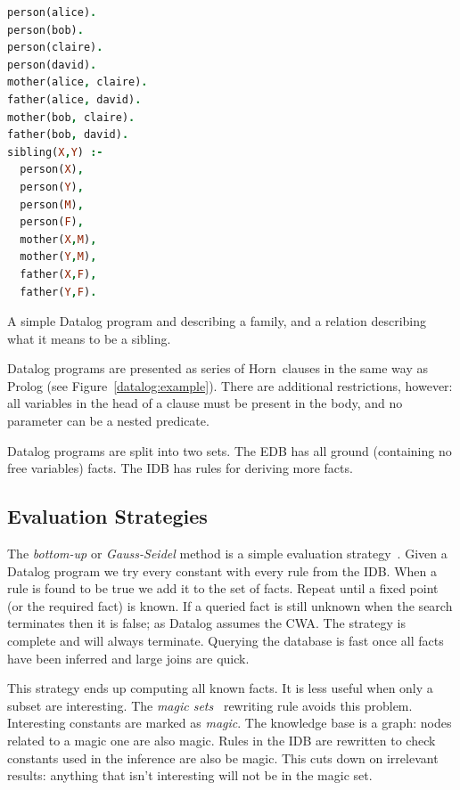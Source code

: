 \documentclass[a4paper]{article}
\begin{document}
\begin{marginfigure}
  \label{datalog:example}
  \begin{lstlisting}[language=Prolog]
person(alice).  
person(bob).
person(claire). 
person(david).
mother(alice, claire).
father(alice, david).
mother(bob, claire).
father(bob, david).
sibling(X,Y) :- 
  person(X),
  person(Y),
  person(M),   
  person(F),
  mother(X,M),
  mother(Y,M), 
  father(X,F), 
  father(Y,F).
  \end{lstlisting}
  \caption{A simple Datalog program and describing a family, and a relation
  describing what it means to be a sibling.}
\end{marginfigure}

Datalog programs are presented as series of Horn~clauses in the
same way as Prolog (see Figure~\ref{datalog:example}).  There are
additional restrictions, however: all variables in the head of a clause
must be present in the body, and no parameter can be a nested predicate.

Datalog programs are split into two sets.
The \ac{EDB} has all ground (containing no free variables) facts.
The \ac{IDB} has rules for deriving more facts.

\subsection{Evaluation Strategies}

The \emph{bottom-up} or \emph{Gauss-Seidel} method is a simple evaluation
strategy~\cite{Ceri:1989ff}.  Given a Datalog program we try every constant with
every rule from the \ac{IDB}.  When a rule is found to be true we add it to the set
of facts.  Repeat until a fixed point (or the required fact) is known.  If a
queried fact is still unknown when the search terminates then it is false; as Datalog assumes
the \ac{CWA}.  The strategy is complete and will always
terminate. Querying the database is fast once all facts have been inferred 
and large joins are quick.

This strategy ends up computing all known facts. It is less useful when only a
subset are interesting.  The \emph{magic sets}~\cite{Bancilhon:1985cz} rewriting
rule avoids this problem.  Interesting constants are marked as \emph{magic}. The
knowledge base is a graph: nodes related to a magic one are also magic.  Rules
in the \ac{IDB} are rewritten to check constants used in the inference are also
be magic.  This cuts down on irrelevant results: anything that isn't
interesting will not be in the magic set.
\end{document}
